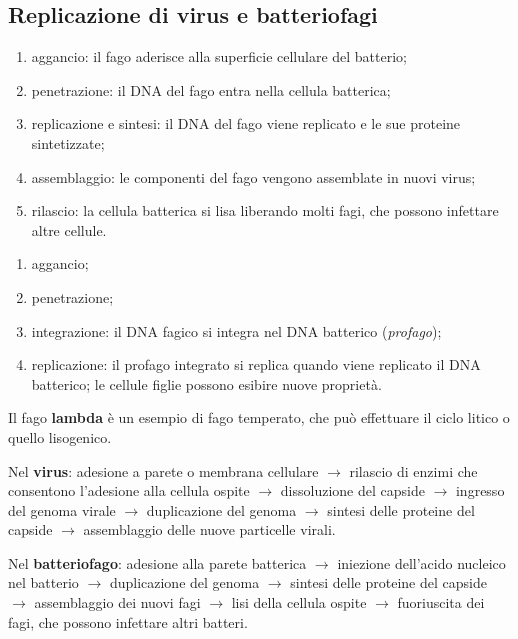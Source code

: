 \subsection{Replicazione di virus e batteriofagi}

\begin{enumerate}
  \item aggancio: il fago aderisce alla superficie cellulare del batterio;
  \item penetrazione: il DNA del fago entra nella cellula batterica;
  \item replicazione e sintesi: il DNA del fago viene replicato e le sue proteine sintetizzate;
  \item assemblaggio: le componenti del fago vengono assemblate in nuovi virus;
  \item rilascio: la cellula batterica si lisa liberando molti fagi, che possono infettare altre cellule.
\end{enumerate}

\begin{enumerate}
  \item aggancio;
  \item penetrazione;
  \item integrazione: il DNA fagico si integra nel DNA batterico (\textit{profago});
  \item replicazione: il profago integrato si replica quando viene replicato il DNA batterico; le cellule figlie possono esibire nuove proprietà.
\end{enumerate}
Il fago \textbf{lambda} è un esempio di fago temperato, che può effettuare il ciclo litico o quello lisogenico.

Nel \textbf{virus}: adesione a parete o membrana cellulare $\rightarrow$ rilascio di enzimi che consentono l'adesione alla cellula ospite $\rightarrow$ dissoluzione del capside $\rightarrow$ ingresso del genoma virale $\rightarrow$ duplicazione del genoma $\rightarrow$ sintesi delle proteine del capside $\rightarrow$ assemblaggio delle nuove particelle virali.

Nel \textbf{batteriofago}: adesione alla parete batterica $\rightarrow$ iniezione dell'acido nucleico nel batterio $\rightarrow$ duplicazione del genoma $\rightarrow$ sintesi delle proteine del capside $\rightarrow$ assemblaggio dei nuovi fagi $\rightarrow$ lisi della cellula ospite $\rightarrow$ fuoriuscita dei fagi, che possono infettare altri batteri.

